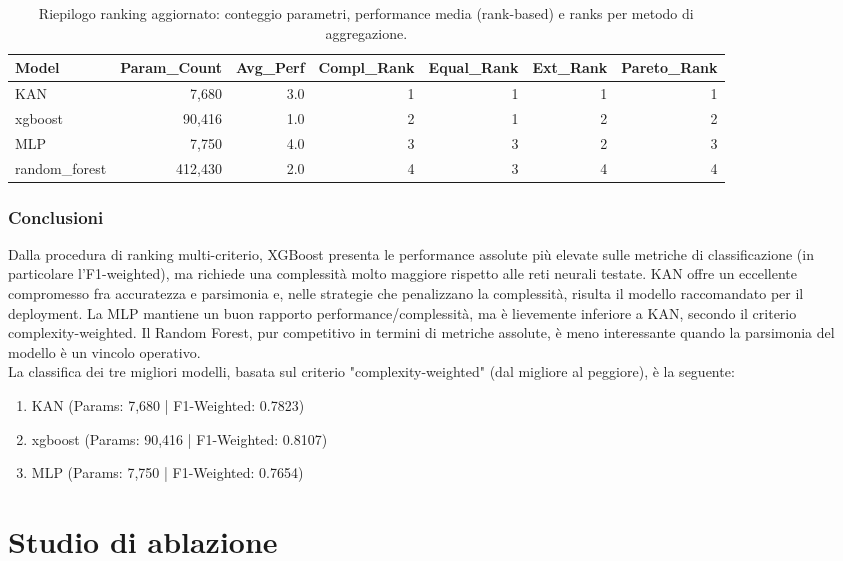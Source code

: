 \documentclass[a4paper,12pt]{report}
\begin{document}
	\begin{table}[H]
		\centering
		\setlength{\tabcolsep}{6pt}
		\caption{Riepilogo ranking aggiornato: conteggio parametri, performance media (rank-based) e ranks per metodo di aggregazione.}
		\begin{tabular}{lrrrrrr}
			\toprule
			\textbf{Model} & \textbf{Param\_Count} & \textbf{Avg\_Perf} & \textbf{Compl\_Rank} & \textbf{Equal\_Rank} & \textbf{Ext\_Rank} & \textbf{Pareto\_Rank} \\
			\midrule
			KAN           & 7,680    & 3.0 & 1 & 1 & 1 & 1 \\
			xgboost       & 90,416   & 1.0 & 2 & 1 & 2 & 2 \\
			MLP           & 7,750    & 4.0 & 3 & 3 & 2 & 3 \\
			random\_forest& 412,430  & 2.0 & 4 & 3 & 4 & 4 \\
			\bottomrule
		\end{tabular}
	\end{table}
	
	\subsubsection{Conclusioni}
	Dalla procedura di ranking multi-criterio, XGBoost presenta le performance assolute più elevate sulle metriche di classificazione (in particolare l'F1-weighted), ma richiede una complessità molto maggiore rispetto alle reti neurali testate. KAN offre un eccellente compromesso fra accuratezza e parsimonia e, nelle strategie che penalizzano la complessità, risulta il modello raccomandato per il deployment. La MLP mantiene un buon rapporto performance/complessità, ma è lievemente inferiore a KAN, secondo il criterio complexity-weighted. Il Random Forest, pur competitivo in termini di metriche assolute, è meno interessante quando la parsimonia del modello è un vincolo operativo. \\
	La classifica dei tre migliori modelli, basata sul criterio "complexity-weighted" (dal migliore al peggiore), è la seguente:
	\begin{enumerate}
		\item KAN \quad (Params: 7,680 \;|\; F1-Weighted: 0.7823)
		\item xgboost \quad (Params: 90,416 \;|\; F1-Weighted: 0.8107)
		\item MLP \quad (Params: 7,750 \;|\; F1-Weighted: 0.7654)
	\end{enumerate}
	
	\section{Studio di ablazione}
	
\end{document}
